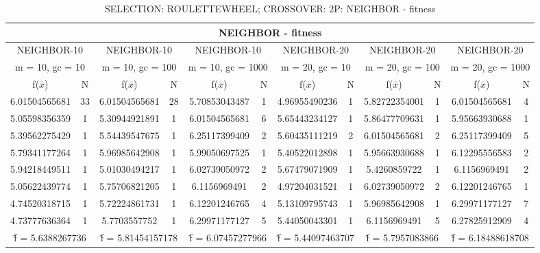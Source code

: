 \begin{table}[H]
	\centering
	\caption{SELECTION: ROULETTEWHEEL; CROSSOVER: 2P: NEIGHBOR - fitness}
	\begin{adjustbox}{width=1\textwidth}
		\begin{tabular}{ |c|c||c|c||c|c||c|c||c|c||c|c| }
			\hline
			\multicolumn{12}{|c|}{NEIGHBOR - fitness} \\
			\hline
			\multicolumn{2}{|c||}{NEIGHBOR-10} & \multicolumn{2}{c||}{NEIGHBOR-10} & \multicolumn{2}{c||}{NEIGHBOR-10} & \multicolumn{2}{c||}{NEIGHBOR-20} & \multicolumn{2}{c||}{NEIGHBOR-20} & \multicolumn{2}{c|}{NEIGHBOR-20}\\
			\hline
			\multicolumn{2}{|c||}{m = 10, gc = 10} & \multicolumn{2}{c||}{m = 10, gc = 100} & \multicolumn{2}{c||}{m = 10, gc = 1000} & \multicolumn{2}{c||}{m = 20, gc = 10} & \multicolumn{2}{c||}{m = 20, gc = 100} & \multicolumn{2}{c|}{m = 20, gc = 1000}\\
			\hline
			f($\bar{x}$) & N & f($\bar{x}$) & N & f($\bar{x}$) & N & f($\bar{x}$) & N & f($\bar{x}$) & N & f($\bar{x}$) & N\\
			\hline
			\hline
			6.01504565681 & 33 & 6.01504565681 & 28 & 5.70853043487 & 1 & 4.96955490236 & 1 & 5.82722354001 & 1 & 6.01504565681 & 4\\
			5.05598356359 & 1 & 5.30944921891 & 1 & 6.01504565681 & 6 & 5.65443234127 & 1 & 5.86477709631 & 1 & 5.95663930688 & 1\\
			5.39562275429 & 1 & 5.54439547675 & 1 & 6.25117399409 & 2 & 5.60435111219 & 2 & 6.01504565681 & 2 & 6.25117399409 & 5\\
			5.79341177264 & 1 & 5.96985642908 & 1 & 5.99050697525 & 1 & 5.40522012898 & 1 & 5.95663930688 & 1 & 6.12295556583 & 2\\
			5.94218449511 & 1 & 5.01030494217 & 1 & 6.02739050972 & 2 & 5.67479071909 & 1 & 5.4260859722 & 1 & 6.1156969491 & 2\\
			5.05622439774 & 1 & 5.75706821205 & 1 & 6.1156969491 & 2 & 4.97204031521 & 1 & 6.02739050972 & 2 & 6.12201246765 & 1\\
			4.74520318715 & 1 & 5.72224861731 & 1 & 6.12201246765 & 4 & 5.13109795743 & 1 & 5.96985642908 & 1 & 6.29971177127 & 7\\
			4.73777636364 & 1 & 5.7703557752 & 1 & 6.29971177127 & 5 & 5.44050043301 & 1 & 6.1156969491 & 5 & 6.27825912909 & 4\\
			\hline
			\multicolumn{2}{|c||}{\^{f} = 5.6388267736} & \multicolumn{2}{c||}{\^{f} = 5.81454157178} & \multicolumn{2}{c||}{\^{f} = 6.07457277966} & \multicolumn{2}{c||}{\^{f} = 5.44097463707} & \multicolumn{2}{c||}{\^{f} = 5.7957083866} & \multicolumn{2}{c|}{\^{f} = 6.18488618708}\\
			\hline
		\end{tabular}
	\end{adjustbox}
\end{table}
